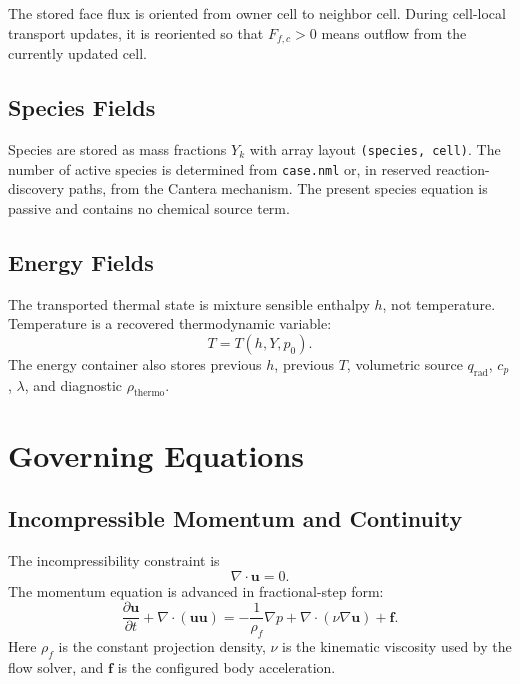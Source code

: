 \documentclass[11pt]{article}
\begin{document}
The stored face flux is oriented from owner cell to neighbor cell.  During
cell-local transport updates, it is reoriented so that \(F_{f,c}>0\) means
outflow from the currently updated cell.

\subsection{Species Fields}

Species are stored as mass fractions \(Y_k\) with array layout
\texttt{(species, cell)}.  The number of active species is determined from
\texttt{case.nml} or, in reserved reaction-discovery paths, from the Cantera
mechanism.  The present species equation is passive and contains no chemical
source term.

\subsection{Energy Fields}

The transported thermal state is mixture sensible enthalpy \(h\), not
temperature.  Temperature is a recovered thermodynamic variable:
\begin{equation}
  T = T(h,Y,p_0).
\end{equation}
The energy container also stores previous \(h\), previous \(T\), volumetric
source \(q_{\mathrm{rad}}\), \(c_p\), \(\lambda\), and diagnostic
\(\rho_{\mathrm{thermo}}\).

\section{Governing Equations}

\subsection{Incompressible Momentum and Continuity}

The incompressibility constraint is
\begin{equation}
  \nabla \cdot \mathbf{u} = 0.
\end{equation}
The momentum equation is advanced in fractional-step form:
\begin{equation}
  \frac{\partial \mathbf{u}}{\partial t}
  +
  \nabla \cdot (\mathbf{u}\mathbf{u})
  =
  -\frac{1}{\rho_f}\nabla p
  +
  \nabla \cdot (\nu \nabla \mathbf{u})
  +
  \mathbf{f}.
\end{equation}
Here \(\rho_f\) is the constant projection density, \(\nu\) is the kinematic
viscosity used by the flow solver, and \(\mathbf{f}\) is the configured body
acceleration.
\end{document}
